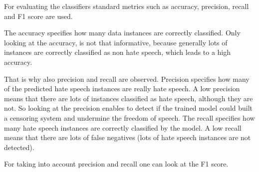 For evaluating the classifiers standard metrics such as accuracy, precision, recall and F1 score are used.

The accuracy specifies how many data instances are correctly classified. Only looking at the accuracy, is not that informative, because generally lots of instances are correctly classified as non hate speech, which leads to a high accuracy.

That is why also precision and recall are observed. Precision specifies how many of the predicted hate speech instances are really hate speech. A low precision means that there are lots of instances classified as hate speech, although they are not. So looking at the precision enables to detect if the trained model could built a censoring system and undermine the freedom of speech. The recall specifies how many hate speech instances are correctly classified by the model. A low recall means that there are lots of false negatives (lots of hate speech instances are not detected).

For taking into account precision and recall one can look at the F1 score. 

